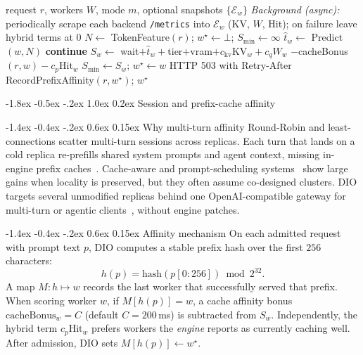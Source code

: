 \documentclass[pdflatex,sn-mathphys-num]{sn-jnl}
\makeatletter
\renewcommand{\section}{\@startsection{section}{1}{\z@}%
  {-1.8ex \@plus -0.5ex \@minus -.2ex}%
  {1.0ex \@plus 0.2ex}%
  {\normalfont\large\bfseries}}%
\renewcommand{\subsection}{\@startsection{subsection}{2}{\z@}%
  {-1.4ex \@plus -0.4ex \@minus -.2ex}%
  {0.6ex \@plus 0.15ex}%
  {\normalfont\normalsize\bfseries}}%
\makeatother
\begin{document}
\begin{algorithm}[ht]
\caption{Worker selection with hybrid scrape, affinity, and admission}
\label{alg:dio}
\begin{algorithmic}[1]
\Require request $r$, workers $W$, mode $m$, optional snapshots $\{\mathcal{E}_w\}$
\State \emph{Background (async):} periodically scrape each backend \texttt{/metrics}
      into $\mathcal{E}_w$ (KV, $W$, Hit); on failure leave hybrid terms at 0
\State $N \leftarrow$ TokenFeature$(r)$; $w^\star\leftarrow\bot$; $S_{\min}\leftarrow\infty$
  \State $\hat{t}_w \leftarrow$ Predict$(w,N)$
   \textbf{continue}
  \EndIf
  \State $S_w \leftarrow$ wait$+\hat{t}_w+$tier$+$vram$+c_{\mathrm{kv}}\mathrm{KV}_w+c_q W_w$
  \Statex \hspace{\algorithmicindent}$-$cacheBonus$(r,w)-c_p\mathrm{Hit}_w$
   $S_{\min}\leftarrow S_w$; $w^\star\leftarrow w$
  \EndIf
\EndFor
{}
  \State \Return HTTP 503 with Retry-After
\EndIf
\State RecordPrefixAffinity$(r,w^\star)$; \Return $w^\star$
\end{algorithmic}
\end{algorithm}

\section{Session and prefix-cache affinity}
\label{sec:affinity}

\subsection{Why multi-turn affinity}
Round-Robin and least-connections scatter multi-turn sessions across replicas.
Each turn that lands on a cold replica re-prefills shared system prompts and agent
context, missing in-engine prefix caches~\cite{radixattention,promptcache,hydragen}.
Cache-aware and prompt-scheduling systems~\cite{preble,cacheblend} show large gains
when locality is preserved, but they often assume co-designed clusters. DIO targets
several unmodified replicas behind one OpenAI-compatible gateway for multi-turn or
agentic clients~\cite{autogen,langgraph}, without engine patches.

\subsection{Affinity mechanism}
On each admitted request with prompt text $p$, DIO computes a stable prefix hash
over the first $256$ characters:
\begin{equation}
h(p) = \mathrm{hash}(p[0{:}256]) \bmod 2^{32}.
\end{equation}
A map $M: h\mapsto w$ records the last worker that successfully served that prefix.
When scoring worker $w$, if $M[h(p)]=w$, a cache affinity bonus
$\mathrm{cacheBonus}_w = C$ (default $C{=}200$\,ms) is subtracted from $S_w$.
Independently, the hybrid term $c_p\mathrm{Hit}_w$ prefers workers the
\emph{engine} reports as currently caching well. After admission, DIO sets
$M[h(p)]\leftarrow w^\star$.
\end{document}
